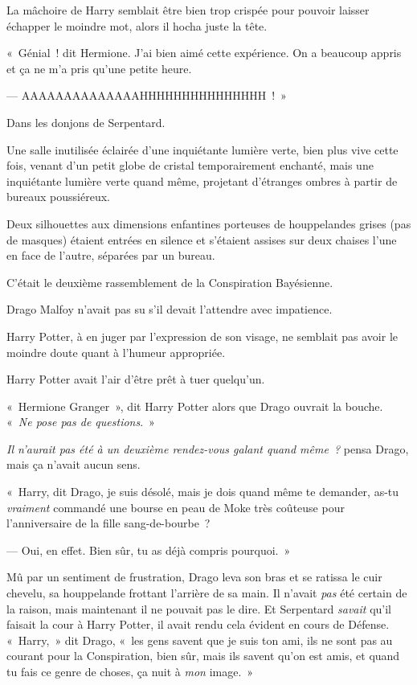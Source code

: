 La mâchoire de Harry semblait être bien trop crispée pour pouvoir laisser échapper le moindre mot, alors il hocha juste la tête.

«~Génial~! dit Hermione.
J'ai bien aimé cette expérience.
On a beaucoup appris et ça ne m'a pris qu'une petite heure.

--- AAAAAAAAAAAAAAHHHHHHHHHHHHHHH~!~»

\later

Dans les donjons de Serpentard.

Une salle inutilisée éclairée d'une inquiétante lumière verte, bien plus vive cette fois, venant d'un petit globe de cristal temporairement enchanté, mais une inquiétante lumière verte quand même, projetant d'étranges ombres à partir de bureaux poussiéreux.

Deux silhouettes aux dimensions enfantines porteuses de houppelandes grises (pas de masques) étaient entrées en silence et s'étaient assises sur deux chaises l'une en face de l'autre, séparées par un bureau.

C'était le deuxième rassemblement de la Conspiration Bayésienne.

Drago Malfoy n'avait pas su s'il devait l'attendre avec impatience.

Harry Potter, à en juger par l'expression de son visage, ne semblait pas avoir le moindre doute quant à l'humeur appropriée.

Harry Potter avait l'air d'être prêt à tuer quelqu'un.

«~Hermione Granger~», dit Harry Potter alors que Drago ouvrait la bouche.
«~\emph{Ne pose pas de questions}.~»

\emph{Il n'aurait pas été à un deuxième rendez-vous galant quand même~?} pensa Drago, mais ça n'avait aucun sens.

«~Harry, dit Drago, je suis désolé, mais je dois quand même te demander, as-tu \emph{vraiment} commandé une bourse en peau de Moke très coûteuse pour l'anniversaire de la fille sang-de-bourbe~?

--- Oui, en effet.
Bien sûr, tu as déjà compris pourquoi.~»

Mû par un sentiment de frustration, Drago leva son bras et se ratissa le cuir chevelu, sa houppelande frottant l'arrière de sa main.
Il n'avait \emph{pas} été certain de la raison, mais maintenant il ne pouvait pas le dire.
Et Serpentard \emph{savait} qu'il faisait la cour à Harry Potter, il avait rendu cela évident en cours de Défense.
«~Harry,~» dit Drago, «~les gens savent que je suis ton ami, ils ne sont pas au courant pour la Conspiration, bien sûr, mais ils savent qu'on est amis, et quand tu fais ce genre de choses, ça nuit à \emph{mon} image.~»

